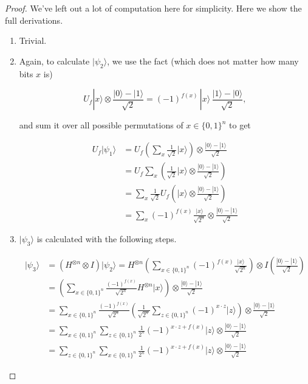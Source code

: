 \documentclass{article}
\begin{document}
    \begin{proof} 
      We've left out a lot of computation here for simplicity. Here we show the full derivations. 
      \begin{enumerate} 
        \item Trivial. 
        \item Again, to calculate $|\psi_2 \rangle$, we use the fact (which does not matter how many bits $x$ is)

          \[U_f |x\rangle \otimes \frac{|0\rangle - |1\rangle}{\sqrt{2}} = (-1)^{f(x)} \,|x\rangle \, \frac{|1\rangle - |0\rangle}{\sqrt{2}},\]

        and sum it over all possible permutations of $x \in \{0, 1\}^n$ to get 

        \begin{align*} 
          U_f |\psi_1 \rangle & = U_f \left( \sum_x \frac{1}{\sqrt{2}} |x\rangle \right) \otimes \frac{|0\rangle - |1\rangle}{\sqrt{2}} \\
          & = U_f \sum_x \left( \frac{1}{\sqrt{2}} |x\rangle \otimes \frac{|0\rangle - |1\rangle}{\sqrt{2}}\right) \\
          & = \sum_x \frac{1}{\sqrt{2}} U_f \left( |x\rangle \otimes \frac{|0\rangle - |1\rangle}{\sqrt{2}} \right) \\
          & = \sum_x (-1)^{f(x)} \frac{|x\rangle}{\sqrt{2^n}} \otimes \frac{|0\rangle - |1\rangle}{\sqrt{2}}
        \end{align*}

        \item $|\psi_3 \rangle$ is calculated with the following steps. 

        \begin{align*} 
          |\psi_3 \rangle & = (H^{\otimes n} \otimes I) |\psi_2 \rangle = H^{\otimes n} \left( \sum_{x \in \{0, 1\}^n} (-1)^{f(x)} \frac{|x\rangle}{\sqrt{2^n}} \right) \otimes I \left( \frac{|0\rangle - |1\rangle}{\sqrt{2}} \right)\\
          & = \left( \sum_{x \in \{0, 1\}^n} \frac{(-1)^{f(x)}}{\sqrt{2^n}} H^{\otimes n} |x\rangle \right) \otimes \frac{|0\rangle - |1\rangle}{\sqrt{2}} \\
          & = \sum_{x \in \{0, 1\}^n} \frac{(-1)^{f(x)}}{\sqrt{2^n}} \left( \frac{1}{\sqrt{2^n}} \sum_{z \in \{0, 1\}^n} (-1)^{x \cdot z} |z \rangle \right) \otimes \frac{|0\rangle - |1\rangle}{\sqrt{2}} \\
          & = \sum_{x \in \{0, 1\}^n} \sum_{z \in \{0, 1\}^n} \frac{1}{2^n} (-1)^{x \cdot z + f(x)} |z\rangle \otimes \frac{|0\rangle - |1\rangle}{\sqrt{2}} \\
          & = \sum_{z \in \{0, 1\}^n} \sum_{x \in \{0, 1\}^n} \frac{1}{2^n} (-1)^{x \cdot z + f(x)} |z\rangle \otimes \frac{|0\rangle - |1\rangle}{\sqrt{2}}
        \end{align*}
      \end{enumerate}
    \end{proof}
\end{document}
